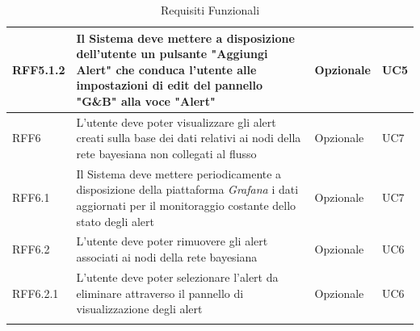 \begin{center}
\begin{longtable}[c]{|m{}|m{}|m{}|m{}|}
\hline
\rowcolor{grigio}RFF5.1.2 & Il Sistema deve mettere a disposizione dell'utente un pulsante "Aggiungi Alert" che conduca l'utente alle impostazioni di edit del pannello "G\&B" alla voce "Alert" & Opzionale & UC5\\
\hline
RFF6 & L'utente deve poter visualizzare gli alert creati sulla base dei dati relativi ai nodi della rete bayesiana non collegati al flusso & Opzionale & UC7\\ 
\hline
\rowcolor{grigio}RFF6.1 & Il Sistema deve mettere periodicamente a disposizione della piattaforma \textit{Grafana} i dati aggiornati per il monitoraggio costante dello stato degli alert & Opzionale & UC7\\
\hline
RFF6.2 & L'utente deve poter rimuovere gli alert associati ai nodi della rete bayesiana & Opzionale & UC6\\
\hline
\rowcolor{grigio}RFF6.2.1 & L'utente deve poter selezionare l'alert da eliminare attraverso il pannello di visualizzazione degli alert & Opzionale & UC6\\
\hline
\caption{Requisiti Funzionali}
\end{longtable}
\end{center}



